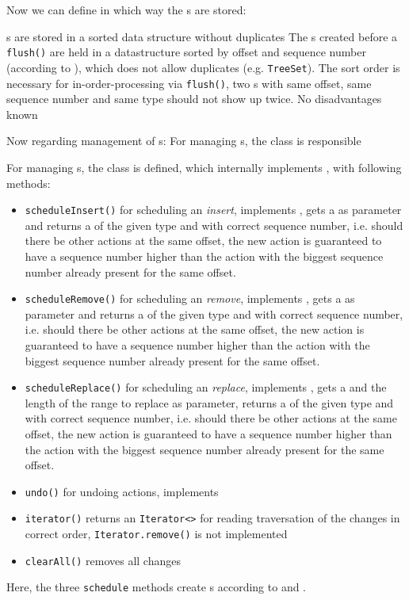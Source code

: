 Now we can define in which way the \MediumAction{}s are stored:

{%
\MediumAction{}s are stored in a sorted data structure without duplicates
}
{%
The \MediumAction{}s created before a \texttt{flush()} are held in a datastructure sorted by offset and sequence number (according to ), which does not allow duplicates (e.g. \texttt{TreeSet}).
}
{%
The sort order is necessary for in-order-processing via \texttt{flush()}, two \MediumAction{}s with same offset, same sequence number and same type should not show up twice.
}
{%
No disadvantages known
}

Now regarding management of \MediumAction{}s:
{%
For managing \MediumAction{}s, the class \MediumChangeManager{} is responsible
}
{%
For managing \MediumAction{}s, the class \MediumChangeManager{} is defined, which internally implements , with following methods:
\begin{itemize}
\item \texttt{scheduleInsert()} for scheduling an \emph{insert}, implements , gets a \MediumRegion{} as parameter and returns a \MediumAction{} of the given type and with correct sequence number, i.e. should there be other actions at the same offset, the new action is guaranteed to have a sequence number higher than the action with the biggest sequence number already present for the same offset.
\item \texttt{scheduleRemove()} for scheduling an \emph{remove}, implements , gets a \MediumRegion{} as parameter and returns a \MediumAction{} of the given type and with correct sequence number, i.e. should there be other actions at the same offset, the new action is guaranteed to have a sequence number higher than the action with the biggest sequence number already present for the same offset.
\item \texttt{scheduleReplace()} for scheduling an \emph{replace}, implements , gets a \MediumRegion{} and the length of the range to replace as parameter, returns a \MediumAction{} of the given type and with correct sequence number, i.e. should there be other actions at the same offset, the new action is guaranteed to have a sequence number higher than the action with the biggest sequence number already present for the same offset.
\item \texttt{undo()} for undoing actions, implements 
\item \texttt{iterator()} returns an \texttt{Iterator<}\MediumAction{}\texttt{>} for reading traversation of the changes in correct order, \texttt{Iterator.remove()} is not implemented
\item \texttt{clearAll()} removes all changes
\end{itemize}
Here, the three \texttt{schedule} methods create \MediumAction{}s according to  and .
}
